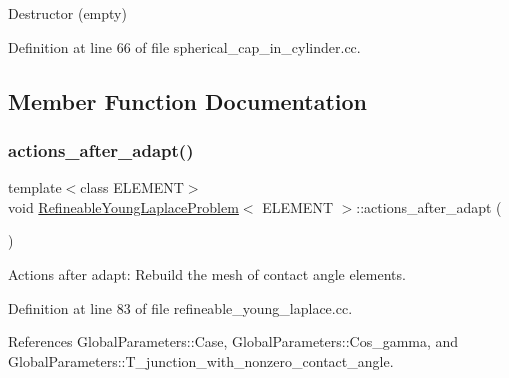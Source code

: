 Destructor (empty) 



Definition at line 66 of file spherical\+\_\+cap\+\_\+in\+\_\+cylinder.\+cc.



\subsection{Member Function Documentation}
\mbox{\label{classRefineableYoungLaplaceProblem_aa2eab8da1b83091df804ede7c60fac87}} 
\subsubsection{\texorpdfstring{actions\+\_\+after\+\_\+adapt()}{actions\_after\_adapt()}\hspace{0.1cm}{\footnotesize\ttfamily [1/2]}}
{\footnotesize\ttfamily template$<$class E\+L\+E\+M\+E\+NT$>$ \\
void \hyperlink{classRefineableYoungLaplaceProblem}{Refineable\+Young\+Laplace\+Problem}$<$ E\+L\+E\+M\+E\+NT $>$\+::actions\+\_\+after\+\_\+adapt (\begin{DoxyParamCaption}{ }\end{DoxyParamCaption})\hspace{0.3cm}{\ttfamily [inline]}}



Actions after adapt\+: Rebuild the mesh of contact angle elements. 



Definition at line 83 of file refineable\+\_\+young\+\_\+laplace.\+cc.



References Global\+Parameters\+::\+Case, Global\+Parameters\+::\+Cos\+\_\+gamma, and Global\+Parameters\+::\+T\+\_\+junction\+\_\+with\+\_\+nonzero\+\_\+contact\+\_\+angle.

\mbox{\label{classRefineableYoungLaplaceProblem_aa2eab8da1b83091df804ede7c60fac87}} 
